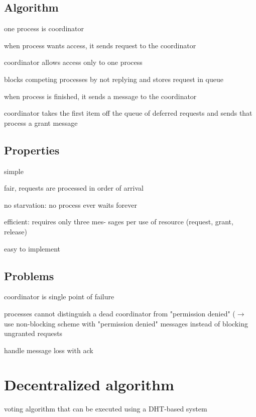 \documentclass[ngerman,a4paper]{report}
\begin{document}
\subsection*{Algorithm}
\begin{compactitem}
	\item one process is coordinator
	\item when process wants access, it sends request to the coordinator
	\item coordinator allows access only to one process
	\item blocks competing processes by not replying and stores request in queue
	\item when process is finished, it sends a message to the coordinator
	\item coordinator takes the first item off the queue of deferred requests and sends that process a grant message
\end{compactitem}

\subsection*{Properties}
\begin{compactitem}
	\item simple
	\item fair, requests are processed in order of arrival
	\item no starvation: no process ever waits forever
	\item efficient: requires only three mes- sages per use of resource (request, grant, release)
	\item easy to implement
\end{compactitem}

\subsection*{Problems}

\begin{compactitem}
	\item coordinator is single point of failure
	\item processes cannot distinguish a dead coordinator from "permission denied" ($\rightarrow$ use non-blocking scheme with "permission denied" messages instead of blocking ungranted requests
	\item handle message loss with ack
\end{compactitem}

\section{Decentralized algorithm}
\begin{compactitem}
	\item voting algorithm that can be executed using a DHT-based system
\end{compactitem}
\end{document}
